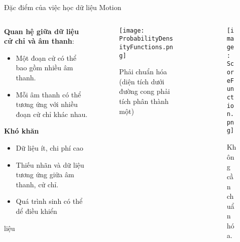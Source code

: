 \begin{frame}{Đặc điểm của việc học dữ liệu Motion}
	
	\begin{columns}
		\begin{column}{0.55\textwidth}
			\textbf{Quan hệ giữa dữ liệu cử chỉ và âm thanh}:
			\begin{itemize}
				\item Một đoạn cử có thể bao gồm nhiều âm thanh.
				\item Mỗi âm thanh có thể tương ứng với nhiều đoạn cử chỉ khác nhau.
			\end{itemize}
			\textbf{Khó khăn}
			\begin{itemize}
				\item Dữ liệu ít, chi phí cao
				\item Thiếu nhãn và dữ liệu tương ứng giữa âm thanh, cử chỉ.
				\item Quá trình sinh có thể dể điều khiển 
			\end{itemize}
			liệu
		\end{column}
		\begin{column}{0.45\textwidth}
			
			\begin{columns}
				\begin{column}{0.5\textwidth}
					\begin{figure}
						\texttt{[image: ProbabilityDensityFunctions.png]}
						\caption{\scriptsize Phải chuẩn hóa (diện tích dưới đường cong phải tích phân thành một)}
					\end{figure}
				\end{column}
				\begin{column}{0.5\textwidth}
					\begin{figure}
						\texttt{[image: ScoreFunction.png]}
						\caption{\scriptsize Không cần chuẩn hóa.}
					\end{figure}
				\end{column}
			\end{columns}
			

\end{column}
\end{columns}
\end{frame}
